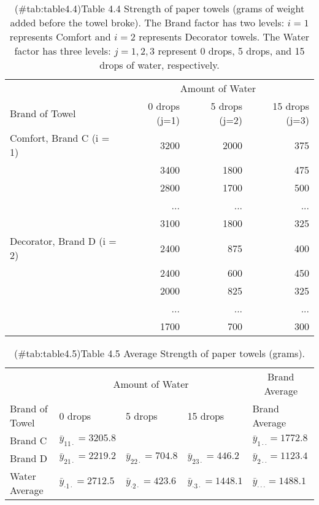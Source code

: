 \documentclass[
]{report}
\begin{document}
\begin{table}[!h]
\centering
\caption{(\#tab:table4.4)Table 4.4 Strength of paper towels (grams of weight added before the towel broke). The Brand factor has two levels: $i=1$ represents Comfort and $i=2$ represents Decorator towels. The Water factor has three levels: $j=1,2,3$ represent 0 drops, 5 drops, and 15 drops of water, respectively.}
\centering
\begin{tabular}[t]{lrrr}
\toprule
\multicolumn{1}{c}{ } & \multicolumn{3}{c}{Amount of Water} \\
\cmidrule(l{3pt}r{3pt}){2-4}
Brand of Towel & 0 drops (j=1) & 5 drops (j=2) & 15 drops (j=3)\\
\midrule
Comfort, Brand C (i = 1) & 3200 & 2000 & 375\\
 & 3400 & 1800 & 475\\
 & 2800 & 1700 & 500\\
 & ... & ... & ...\\
 & 3100 & 1800 & 325\\
\addlinespace
Decorator, Brand D (i = 2) & 2400 & 875 & 400\\
 & 2400 & 600 & 450\\
 & 2000 & 825 & 325\\
 & ... & ... & ...\\
 & 1700 & 700 & 300\\
\bottomrule
\end{tabular}
\end{table}

\begin{table}[!h]
\centering
\caption{(\#tab:table4.5)Table 4.5 Average Strength of paper towels (grams).}
\centering
\begin{tabular}[t]{lllll}
\toprule
\multicolumn{1}{c}{ } & \multicolumn{3}{c}{Amount of Water} & \multicolumn{1}{c}{Brand Average} \\
\cmidrule(l{3pt}r{3pt}){2-4} \cmidrule(l{3pt}r{3pt}){5-5}
Brand of Towel & 0 drops & 5 drops & 15 drops & Brand Average\\
\midrule
Brand C & $\bar y_{11\cdot} = 3205.8$ &  &  & $\bar y_{1\cdot\cdot} = 1772.8$\\
Brand D & $\bar y_{21\cdot} = 2219.2$ & $\bar y_{22\cdot} = 704.8$ & $\bar y_{23\cdot} = 446.2$ & $\bar y_{2\cdot\cdot} = 1123.4$\\
Water Average & $\bar y_{\cdot1\cdot} = 2712.5$ & $\bar y_{\cdot2\cdot} = 423.6$ & $\bar y_{\cdot3\cdot} = 1448.1$ & $\bar y_{\cdot\cdot\cdot} = 1488.1$\\
\bottomrule
\end{tabular}
\end{table}
\end{document}
